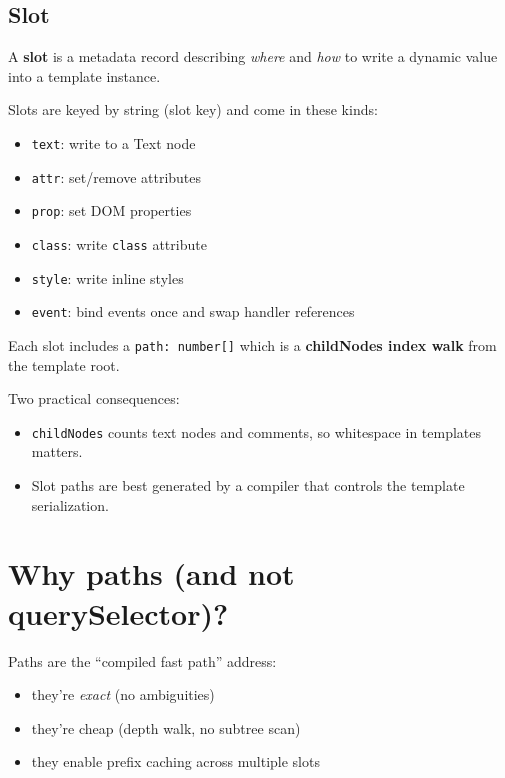 \subsection{Slot}

A \textbf{slot} is a metadata record describing \emph{where} and \emph{how} to write a dynamic value into a template instance.

Slots are keyed by string (slot key) and come in these kinds:

\begin{itemize}
  \item \texttt{text}: write to a Text node
  \item \texttt{attr}: set/remove attributes
  \item \texttt{prop}: set DOM properties
  \item \texttt{class}: write \texttt{class} attribute
  \item \texttt{style}: write inline styles
  \item \texttt{event}: bind events once and swap handler references
\end{itemize}

Each slot includes a \texttt{path: number[]} which is a \textbf{childNodes index walk} from the template root.

Two practical consequences:

\begin{itemize}
  \item \texttt{childNodes} counts text nodes and comments, so whitespace in templates matters.
  \item Slot paths are best generated by a compiler that controls the template serialization.
\end{itemize}

\section{Why paths (and not querySelector)?}

Paths are the “compiled fast path” address:

\begin{itemize}
  \item they’re \emph{exact} (no ambiguities)
  \item they’re cheap (depth walk, no subtree scan)
  \item they enable prefix caching across multiple slots
\end{itemize}

\begin{center}
\end{center}

